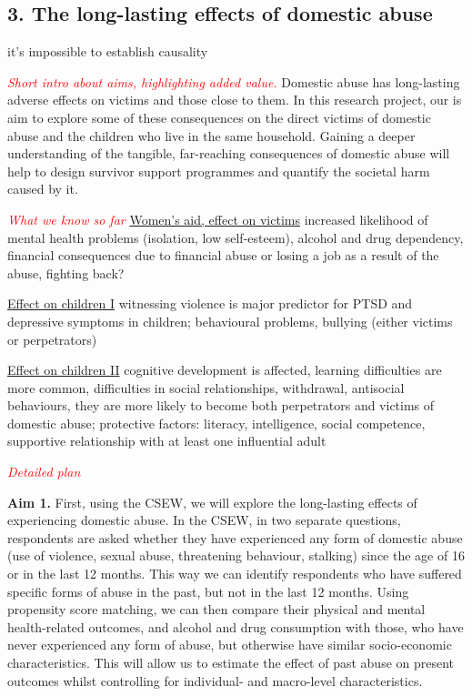 \documentclass[11pt, a4paper]{article}
\begin{document}
\subsection*{3. The long-lasting effects of domestic abuse}

it's impossible to establish causality

 \textcolor{red}{\textit{Short intro about aims, highlighting added value.}}
Domestic abuse has long-lasting adverse effects on victims and those close to them. In this research project, our is aim to explore some of these consequences on the direct victims of domestic abuse and the children who live in the same household. Gaining a deeper understanding of the tangible, far-reaching consequences of domestic abuse will help to design survivor support programmes and quantify the societal harm caused by it.


\textcolor{red}{\textit{What we know so far}}
\href{https://www.womensaid.org.uk/information-support/what-is-domestic-abuse/the-nature-and-impact-of-domestic-abuse/}{Women's aid, effect on victims} increased likelihood of mental health problems (isolation, low self-esteem), alcohol and drug dependency, financial consequences due to financial abuse or losing a job as a result of the abuse, fighting back?

\href{https://uksaysnomore.org/effects-of-domestic-abuse-on-children/}{Effect on children I} witnessing violence is major predictor for PTSD and depressive symptoms in children; behavioural problems, bullying (either victims or perpetrators)

\href{https://www.psychologytoday.com/gb/blog/progress-notes/201902/alarming-effects-childrens-exposure-domestic-violence}{Effect on children II} cognitive development is affected, learning difficulties are more common, difficulties in social relationships, withdrawal, antisocial behaviours, they are more likely to become both perpetrators and victims of domestic abuse; protective factors: literacy, intelligence, social competence, supportive relationship with at least one influential adult 


\textcolor{red}{\textit{Detailed plan}}

\textbf{Aim 1.} First, using the CSEW, we will explore the long-lasting effects of experiencing domestic abuse. In the CSEW, in two separate questions, respondents are asked whether they have experienced any form of domestic abuse (use of violence, sexual abuse, threatening behaviour, stalking) since the age of 16 or in the last 12 months. This way we can identify respondents who have suffered specific forms of abuse in the past, but not in the last 12 months. Using propensity score matching, we can then compare their physical and mental health-related outcomes, and alcohol and drug consumption with those, who have never experienced any form of abuse, but otherwise have similar socio-economic characteristics. This will allow us to estimate the effect of past abuse on present outcomes whilst controlling for individual- and macro-level characteristics.  
\end{document}
